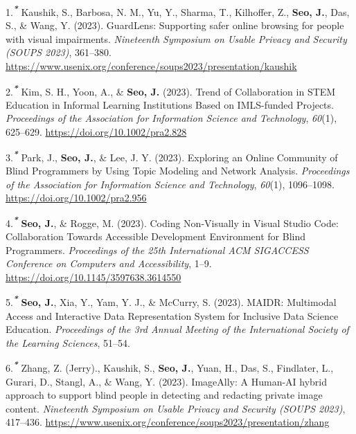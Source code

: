 \documentclass[11pt,a4paper,]{awesome-cv}
\newlength{\cslhangindent}
\newenvironment{CSLReferences}[2] %
 {\begin{list}{}{%
  \setlength{\itemindent}{0pt}
  \setlength{\leftmargin}{0pt}
  \setlength{\parsep}{0pt}
  \ifodd #1
   \setlength{\leftmargin}{\cslhangindent}
   \setlength{\itemindent}{-1\cslhangindent}
  \fi
  \setlength{\itemsep}{#2\baselineskip}}}
 {\end{list}}
\begin{document}
\label{refs-d109e98058cd5ccf7ad39dcb6b0899eb}
\begin{CSLReferences}{1}{0}
1.\textsuperscript{\textbf{\emph{*}}} Kaushik, S., Barbosa, N. M., Yu,
Y., Sharma, T., Kilhoffer, Z., \textbf{Seo, J.}, Das, S., \& Wang, Y.
(2023). GuardLens: Supporting safer online browsing for people with
visual impairments. \emph{Nineteenth Symposium on Usable Privacy and
Security (SOUPS 2023)}, 361--380.
\url{https://www.usenix.org/conference/soups2023/presentation/kaushik}

2.\textsuperscript{\textbf{\emph{*}}} Kim, S. H., Yoon, A., \&
\textbf{Seo, J.} (2023). Trend of Collaboration in STEM Education in
Informal Learning Institutions Based on IMLS-funded Projects.
\emph{Proceedings of the Association for Information Science and
Technology}, \emph{60}(1), 625--629.
\url{https://doi.org/10.1002/pra2.828}

3.\textsuperscript{\textbf{\emph{*}}} Park, J., \textbf{Seo, J.}, \&
Lee, J. Y. (2023). Exploring an Online Community of Blind Programmers by
Using Topic Modeling and Network Analysis. \emph{Proceedings of the
Association for Information Science and Technology}, \emph{60}(1),
1096--1098. \url{https://doi.org/10.1002/pra2.956}

4.\textsuperscript{\textbf{\emph{*}}} \textbf{Seo, J.}, \& Rogge, M.
(2023). Coding Non-Visually in Visual Studio Code: Collaboration Towards
Accessible Development Environment for Blind Programmers.
\emph{Proceedings of the 25th International ACM SIGACCESS Conference on
Computers and Accessibility}, 1--9.
\url{https://doi.org/10.1145/3597638.3614550}

5.\textsuperscript{\textbf{\emph{*}}} \textbf{Seo, J.}, Xia, Y., Yam, Y.
J., \& McCurry, S. (2023). MAIDR: Multimodal Access and Interactive Data
Representation System for Inclusive Data Science Education.
\emph{Proceedings of the 3rd Annual Meeting of the International Society
of the Learning Sciences}, 51--54.

6.\textsuperscript{\textbf{\emph{*}}} Zhang, Z. (Jerry)., Kaushik, S.,
\textbf{Seo, J.}, Yuan, H., Das, S., Findlater, L., Gurari, D., Stangl,
A., \& Wang, Y. (2023). ImageAlly: A Human-AI hybrid approach to support
blind people in detecting and redacting private image content.
\emph{Nineteenth Symposium on Usable Privacy and Security (SOUPS 2023)},
417--436.
\url{https://www.usenix.org/conference/soups2023/presentation/zhang}


\end{CSLReferences}
\end{document}
